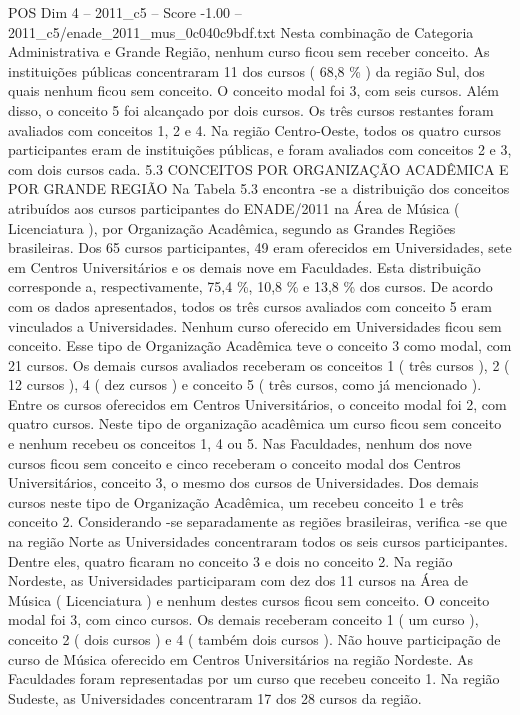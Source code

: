 \begin{textsample}{POS Dim 4 – 2011\_c5 – Score -1.00 – 2011\_c5/enade\_2011\_mus\_0c040c9bdf.txt}
Nesta combinação de Categoria Administrativa e Grande Região, nenhum curso ficou sem receber conceito.
As instituições públicas concentraram 11 dos cursos ( 68,8 \% ) da região Sul, dos quais nenhum ficou sem conceito.
O conceito modal foi 3, com seis cursos.
Além disso, o conceito 5 foi alcançado por dois cursos.
Os três cursos restantes foram avaliados com conceitos 1, 2 e 4.
Na região Centro-Oeste, todos os quatro cursos participantes eram de instituições públicas, e foram avaliados com conceitos 2 e 3, com dois cursos cada. 5.3 CONCEITOS POR ORGANIZAÇÃO ACADÊMICA E POR GRANDE REGIÃO Na Tabela 5.3 encontra -se a distribuição dos conceitos atribuídos aos cursos participantes do ENADE/2011 na Área de Música ( Licenciatura ), por Organização Acadêmica, segundo as Grandes Regiões brasileiras.
Dos 65 cursos participantes, 49 eram oferecidos em Universidades, sete em Centros Universitários e os demais nove em Faculdades.
Esta distribuição corresponde a, respectivamente, 75,4 \%, 10,8 \% e 13,8 \% dos cursos.
De acordo com os dados apresentados, todos os três cursos avaliados com conceito 5 eram vinculados a Universidades.
Nenhum curso oferecido em Universidades ficou sem conceito.
Esse tipo de Organização Acadêmica teve o conceito 3 como modal, com 21 cursos.
Os demais cursos avaliados receberam os conceitos 1 ( três cursos ), 2 ( 12 cursos ), 4 ( dez cursos ) e conceito 5 ( três cursos, como já mencionado ).
Entre os cursos oferecidos em Centros Universitários, o conceito modal foi 2, com quatro cursos.
Neste tipo de organização acadêmica um curso ficou sem conceito e nenhum recebeu os conceitos 1, 4 ou 5.
Nas Faculdades, nenhum dos nove cursos ficou sem conceito e cinco receberam o conceito modal dos Centros Universitários, conceito 3, o mesmo dos cursos de Universidades.
Dos demais cursos neste tipo de Organização Acadêmica, um recebeu conceito 1 e três conceito 2.
Considerando -se separadamente as regiões brasileiras, verifica -se que na região Norte as Universidades concentraram todos os seis cursos participantes.
Dentre eles, quatro ficaram no conceito 3 e dois no conceito 2.
Na região Nordeste, as Universidades participaram com dez dos 11 cursos na Área de Música ( Licenciatura ) e nenhum destes cursos ficou sem conceito.
O conceito modal foi 3, com cinco cursos.
Os demais receberam conceito 1 ( um curso ), conceito 2 ( dois cursos ) e 4 ( também dois cursos ).
Não houve participação de curso de Música oferecido em Centros Universitários na região Nordeste.
As Faculdades foram representadas por um curso que recebeu conceito 1.
Na região Sudeste, as Universidades concentraram 17 dos 28 cursos da região.

\end{textsample}
